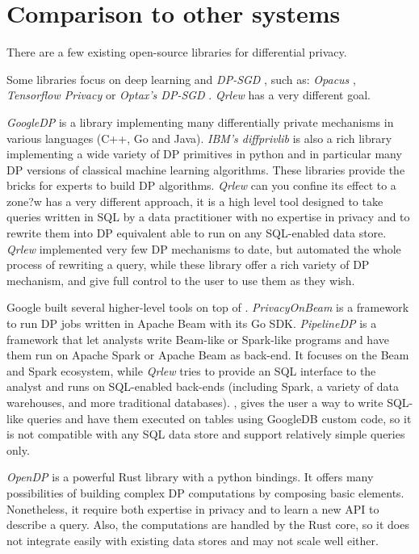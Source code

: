 \documentclass[letterpaper]{article} %
\newcommand{\qrlew}{\emph{Qrlew}}
\begin{document}
\section{Comparison to other systems}

There are a few existing open-source libraries for differential privacy.

Some libraries focus on deep learning and \emph{DP-SGD} \cite{abadi2016deep}, such as: \emph{Opacus} \cite{yousefpour2021opacus}, \emph{Tensorflow Privacy} \cite{TensorFlowPrivacy} or \emph{Optax's DP-SGD} \cite{deepmind2020jax}. \qrlew{} has a very different goal.

\emph{GoogleDP} \cite{GoogleDP} is a library implementing many differentially private mechanisms in various languages (C++, Go and Java).
\emph{IBM's diffprivlib} \cite{diffprivlib} is also a rich library implementing a wide variety of DP primitives in python and in particular many DP versions of classical machine learning algorithms. 
These libraries provide the bricks for experts to build DP algorithms. \qrlew{} can you confine its effect to a zone?w{} has a very different approach, it is a high level tool designed to take queries written in SQL by a data practitioner with no expertise in privacy and to rewrite them into DP equivalent able to run on any SQL-enabled data store. \qrlew{} implemented very few DP mechanisms to date, but automated the whole process of rewriting a query, while these library offer a rich variety of DP mechanism, and give full control to the user to use them as they wish.

Google built several higher-level tools on top of \cite{GoogleDP}.
\emph{PrivacyOnBeam} \cite{PrivacyOnBeam} is a framework to run DP jobs written in Apache Beam with its Go SDK.
\emph{PipelineDP} \cite{PipelineDP} is a framework that let analysts write Beam-like or Spark-like programs and have them run on Apache Spark or Apache Beam as back-end. It focuses on the Beam and Spark ecosystem, while \qrlew{} tries to provide an SQL interface to the analyst and runs on SQL-enabled back-ends (including Spark, a variety of data warehouses, and more traditional databases).
\cite{ZetaSQL}, gives the user a way to write SQL-like queries and have them executed on tables using GoogleDB custom code, so it is not  compatible with any SQL data store and support relatively simple queries only.

\emph{OpenDP} \cite{OpenDP} is a powerful Rust library with a python bindings. It offers many possibilities of building complex DP computations by composing basic elements. Nonetheless, it require both expertise in privacy and to learn a new API to describe a query. Also, the computations are handled by the Rust core, so it does not integrate easily with existing data stores and may not scale well either.
\end{document}
